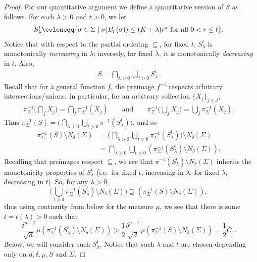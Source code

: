 \documentclass[preprint, reqno]{amsart}
\theoremstyle{definition}
\numberwithin{equation}{section}
\begin{document}
\begin{proof}
  For our quantitative argument we define a quantitative version of
  $S$ as follows. For each $\lambda>0$ and $t>0$, we let
  \begin{align}
    S_\lambda^t \coloneqq \{ \sigma \in \Sigma \mid \nu(B_r(\sigma))
    \le (K+\lambda) r^s \hbox{ for all $0<r\le t$}\}.
  \end{align}
  Notice that with respect to the partial ordering $\subseteq$, for
  fixed $t$, $S_\lambda^t$ is monotonically \emph{increasing} in
  $\lambda$; inversely, for fixed $\lambda$, it is monotonically
  \emph{decreasing} in $t$. Also,
  \begin{align*}
    S= \bigcap_{\lambda >0}  \bigcup_{t>0}  S^t_\lambda.
  \end{align*}
  Recall that for a general function $f$, the preimage $f^{-1}$
  respects arbitrary intersections/unions. In particular, for an
  arbitrary collection $\{X_j\}_{j \in J}$,
  \begin{align*}
    \pi_\Sigma^{-1} \Big(\bigcap _j X_j\Big)= \bigcap_j
    \pi_\Sigma^{-1} (X_j) \qquad \text{and} \qquad \pi_\Sigma^{-1}
    \Big(\bigcup_j X_j\Big) = \bigcup_j \pi_\Sigma^{-1} (X_j).
  \end{align*}
  Thus $\displaystyle \pi_{\Sigma}^{-1}(S) = \Big(\bigcap_{\lambda >0}
  \bigcup_{t>0} \pi^{-1} ( S^t_\lambda) \Big)$, and so
  \begin{align*}
    \pi_{\Sigma}^{-1}(S)\setminus N_{\delta}(\Sigma)
    &= \Big(\bigcap_{\lambda >0} \bigcup_{t>0} \pi_\Sigma^{-1} (
      S^t_\lambda) \Big)\setminus N_{\delta}(\Sigma)\\
    &=\bigcap_{\lambda >0} \bigcup_{t>0} \left( \pi_\Sigma^{-1} (
      S^t_\lambda) \setminus N_{\delta}(\Sigma) \right).
  \end{align*}
  Recalling that preimages respect $\subseteq$, we see that
  $\pi^{-1}(S^t_\lambda) \setminus N_{\delta}(\Sigma)$ inherits the
  monotonicity properties of $S_\lambda^t$ (i.e.\ for fixed $t$,
  increasing in $\lambda$; for fixed $\lambda$, decreasing in $t$).
  So, for any $\lambda > 0$,
  \[
    \Big(\bigcup_{t > 0}\pi_{\Sigma}^{-1}(S_{\lambda}^t)\setminus
    N_{\delta}(\Sigma) \Big) \supseteq (\pi_{\Sigma}^{-1}(S)\setminus
    N_{\delta}(\Sigma)),
  \]
  thus using continuity from below for the measure $\mu$, we see that
  there is some $t = t(\lambda) > 0$ such that
  \[
    \frac{\delta^{p-1}}{\sqrt{d}}\mu(\pi_{\Sigma}^{-1}(S_\lambda^t)
    \setminus N_{\delta}(\Sigma)) >
    \frac{1}{2}\frac{\delta^{p-1}}{\sqrt{d}}\mu(\pi_{\Sigma}^{-1}(S)
    \setminus N_{\delta}(\Sigma)) = \frac{1}{2}C_{1}.
  \]
  Below, we will consider such $S_\lambda^t$. Notice that such
  $\lambda$ and $t$ are chosen depending only on $d, \delta, \mu, S$
  and $\Sigma$.


\end{proof}
\end{document}
